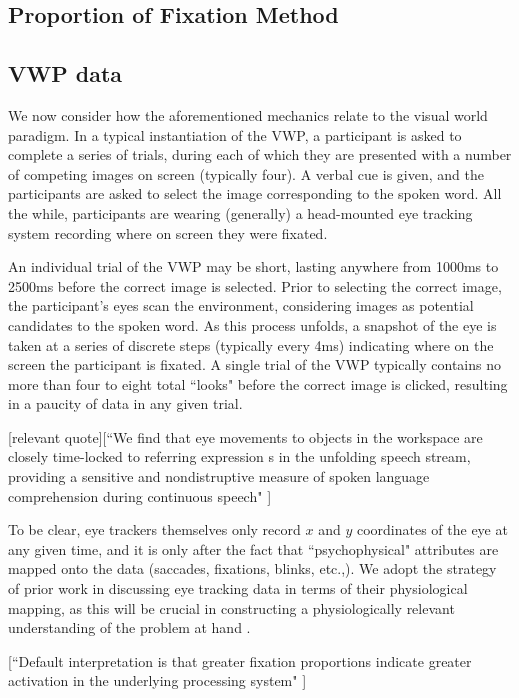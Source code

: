 \documentclass{article}
\begin{document}
\subsection{Proportion of Fixation Method}

\subsection{VWP data}


We now consider how the aforementioned mechanics relate to the visual world paradigm. In a typical instantiation of the VWP, a participant is asked to complete a series of trials, during each of which they are presented with a number of competing images on screen (typically four). A verbal cue is given, and the participants are asked to select the image corresponding to the spoken word. All the while, participants are wearing (generally) a head-mounted eye tracking system recording where on screen they were fixated. 

An individual trial of the VWP may be short, lasting anywhere from 1000ms to 2500ms before the correct image is selected. Prior to selecting the correct image, the participant's eyes scan the environment, considering images as potential candidates to the spoken word. As this process unfolds, a snapshot of the eye is taken at a series of discrete steps (typically every 4ms) indicating where on the screen the participant is fixated. A single trial of the VWP typically contains no more than four to eight total ``looks" before the correct image is clicked, resulting in a paucity of data in any given trial.

[relevant quote][``We find that eye movements to objects in the workspace are closely time-locked to referring expression s in the unfolding speech stream, providing a sensitive and nondistruptive measure of spoken language comprehension during continuous speech" \cite{allopenna1998tracking}]

To be clear, eye trackers themselves only record $x$ and $y$ coordinates of the eye at any given time, and it is only after the fact that ``psychophysical" attributes are mapped onto the data (saccades, fixations, blinks, etc.,). We adopt the strategy of prior work in discussing eye tracking data in terms of their physiological mapping, as this will be crucial in constructing a physiologically relevant understanding of the problem at hand \cite{mcmurray2002look}.

[``Default interpretation is that greater fixation proportions indicate greater activation in the underlying processing system" \cite{Magnuson2019}]
\end{document}

